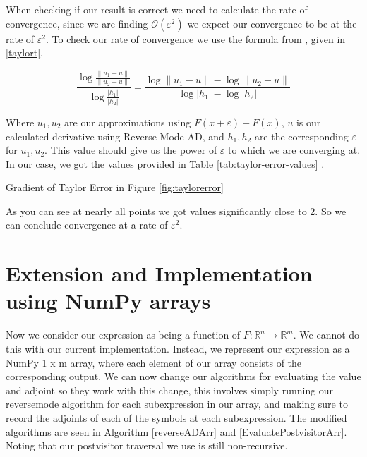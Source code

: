 \documentclass{article}
\begin{document}
When checking if our result is correct we need to calculate the rate of convergence, since we are finding $\mathcal{O}(\varepsilon^2)$ we expect our convergence to be at the rate of $\varepsilon^2$. To check our rate of convergence we use the formula from \cite{finite}, given in \eqref{taylort}.

\begin{equation} \label{taylort}
   \frac{\log{\frac{\|u_1 - u\|}{\|u_2 - u\|}}}{\log{\frac{|h_1|}{|h_2|}}} = \frac{\log\|u_1 - u\| - \log\|u_2 - u\|}{\log|h_1| - \log|h_2|}
\end{equation}

Where $u_1, u_2$ are our approximations using $F(x + \varepsilon) - F(x)$, $u$ is our calculated derivative using Reverse Mode AD, and $h_1, h_2$ are the corresponding $\varepsilon$ for $u_1, u_2$. This value should give us the power of $\varepsilon$ to which we are converging at. In our case, we got the values provided in Table \ref{tab:taylor-error-values} \cite{github}.

\begin{table}[h]
    \begin{center}
    \end{center}
    \caption{Gradient of Taylor Error in Figure \ref{fig:taylorerror}}
    \label{tab:taylor-error-values}
\end{table}


As you can see at nearly all points we got values significantly close to 2. So we can conclude convergence at a rate of $\varepsilon^2$.


\section{Extension and Implementation using NumPy arrays}

Now we consider our expression as being a function of $F: \mathbb{R}^n \longrightarrow \mathbb{R}^m$. We cannot do this with our current implementation. Instead, we represent our expression as a NumPy 1 x m array, where each element of our array consists of the corresponding output. We can now change our algorithms for evaluating the value and adjoint so they work with this change, this involves simply running our reversemode algorithm for each subexpression in our array, and making sure to record the adjoints of each of the symbols at each subexpression. The modified algorithms are seen in Algorithm \ref{reverseADArr} and \ref{EvaluatePostvisitorArr}. Noting that our postvisitor traversal we use is still non-recursive.
\end{document}

